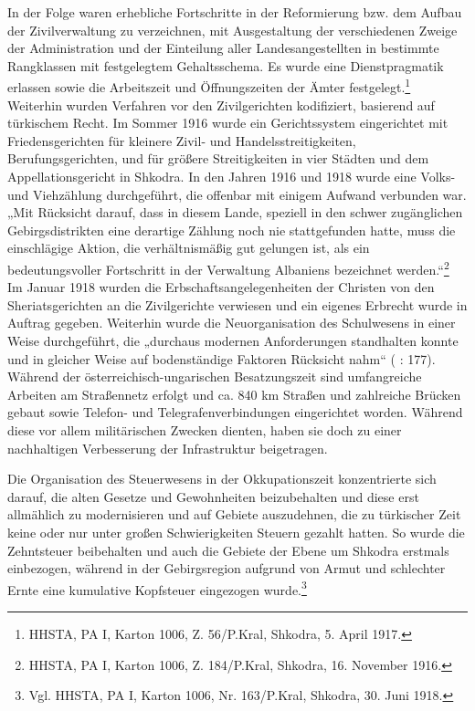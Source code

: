 In der Folge waren erhebliche Fortschritte in der Reformierung bzw. dem Aufbau der Zivilverwaltung zu verzeichnen, mit Ausgestaltung der verschiedenen Zweige der Administration und der Einteilung aller Landesangestellten in bestimmte Rangklassen mit festgelegtem Gehaltsschema. Es wurde eine Dienstpragmatik erlassen sowie die Arbeitszeit und Öffnungszeiten der Ämter festgelegt.\footnote{HHSTA, PA I, Karton 1006, Z. 56/P.Kral, Shkodra, 5. April 1917. } Weiterhin wurden Verfahren vor den Zivilgerichten kodifiziert, basierend auf türkischem Recht. Im Sommer 1916 wurde ein Gerichtssystem eingerichtet mit Friedensgerichten für kleinere Zivil- und Handelsstreitigkeiten, Berufungsgerichten, und für größere Streitigkeiten in vier Städten und dem Appellationsgericht in Shkodra. In den Jahren 1916 und 1918 wurde eine Volks- und Viehzählung durchgeführt, die offenbar mit einigem Aufwand verbunden war. „Mit Rücksicht darauf, dass in diesem Lande, speziell in den schwer zugänglichen Gebirgsdistrikten eine derartige Zählung noch nie stattgefunden hatte, muss die einschlägige Aktion, die verhältnismäßig gut gelungen ist, als ein bedeutungsvoller Fortschritt in der Verwaltung Albaniens bezeichnet werden.“\footnote{HHSTA, PA I, Karton 1006, Z. 184/P.Kral, Shkodra, 16. November 1916.} Im Januar 1918 wurden die Erbschaftsangelegenheiten der Christen von den Sheriatsgerichten an die Zivilgerichte verwiesen und ein eigenes Erbrecht wurde in Auftrag gegeben. Weiterhin wurde die Neuorganisation des Schulwesens in einer Weise durchgeführt, die „durchaus modernen Anforderungen standhalten konnte und in gleicher Weise auf bodenständige Faktoren Rücksicht nahm“ (\cite{schwanke} : 177). Während der österreichisch-ungarischen Besatzungszeit sind umfangreiche Arbeiten am Straßennetz erfolgt und ca. 840 km Straßen und zahlreiche Brücken gebaut sowie Telefon- und Telegrafenverbindungen eingerichtet worden. Während diese vor allem militärischen Zwecken dienten, haben sie doch zu einer nachhaltigen Verbesserung der Infrastruktur beigetragen.\par
Die Organisation des Steuerwesens in der Okkupationszeit konzentrierte sich darauf, die alten Gesetze und Gewohnheiten beizubehalten und diese erst allmählich zu modernisieren und auf Gebiete auszudehnen, die zu türkischer Zeit keine oder nur unter großen Schwierigkeiten Steuern gezahlt hatten. So wurde die Zehntsteuer beibehalten und auch die Gebiete der Ebene um Shkodra erstmals einbezogen, während in der Gebirgsregion aufgrund von Armut und schlechter Ernte eine kumulative Kopfsteuer eingezogen wurde.\footnote{Vgl. HHSTA, PA I, Karton 1006, Nr. 163/P.Kral, Shkodra, 30. Juni 1918.}\par
